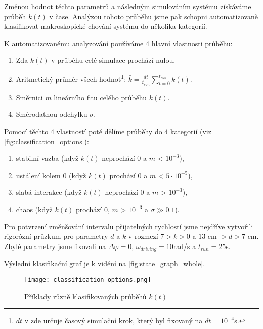 Změnou hodnot těchto parametrů a následným simulováním systému získáváme průběh $k(t)$ v čase. Analýzou tohoto průběhu jsme pak schopni automatizovaně klasifikovat makroskopické chování systému do několika kategorií.

K automatizovanému analyzování používáme 4 hlavní vlastnosti průběhu:
\begin{enumerate}[topsep=0pt, partopsep=0pt]
    \setlength{\itemsep}{0pt}%
    \setlength{\parskip}{0pt}%
    \item Zda $k(t)$ v průběhu celé simulace prochází nulou.
    \item Aritmetický průměr všech hodnot\footnote{$dt$ v zde určuje časový simulační krok, který byl fixovaný na $dt = 10^{-4}$s.}: $\bar{k} = \frac{dt}{t_{run}}\sum_{t=0}^{t_{run}} k(t)$.
    \item Směrnici $m$ lineárního fitu celého průběhu $k(t)$.
    \item Směrodatnou odchylku $\sigma$.
\end{enumerate}

Pomocí těchto 4 vlastností poté dělíme průběhy do 4 kategorií (viz \autoref{fig:classification_options}):

\begin{enumerate}[topsep=0pt, partopsep=0pt]
    \setlength{\itemsep}{0pt}%
    \setlength{\parskip}{0pt}%
    \item stabilní vazba (když $k(t)$ neprochází 0 a $m$ < $10^{-3}$),
    \item ustálení kolem 0 (když $k(t)$ prochází 0 a $m$ < $5\cdot10^{-5}$),
    \item slabá interakce (když $k(t)$ neprochází 0 a $m$ > $10^{-3}$),
    \item chaos (když $k(t)$ prochází 0, $m$ > $10^{-3}$ a $\sigma \gg 0.1$).
\end{enumerate}

Pro potvrzení změnšování intervalu přijatelných rychlostí jsme nejdříve vytvořili rigorózní průzkum pro parametry $d$ a $k$ v rozmezí $7 > k > 0$ a $13$ cm $> d > 7$ cm. Zbylé parametry jsme fixovali na $\Delta \varphi = 0$, $\omega_{driving} = 10$rad/s a $t_{run} = 25$s.

Výslední klasifikační graf je k vidění na \autoref{fig:state_graph_whole}.

\begin{figure}[H]
    \texttt{[image: classification\_options.png]}
    \centering
    \caption{Příklady různě klasifikovaných průběhů $k(t)$}
    \label{fig:classification_options}
\end{figure}

